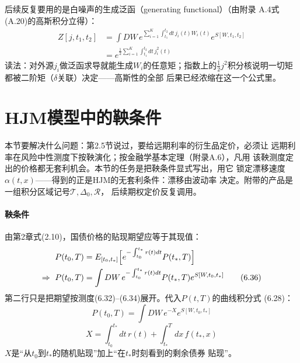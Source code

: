 
后续反复要用的是白噪声的生成泛函（generating functional）（由附录
A.4式(A.20)的高斯积分立得）：
\begin{align*}
Z[j,t_1,t_2]&=\int DW\,e^{\sum_{i=1}^{K}\int_{t_1}^{t_2}dt\,j_i(t)W_i(t)}
e^{S[W,t_1,t_2]}\\
&=e^{\frac{1}{2}\sum_{i=1}^{K}\int_{t_1}^{t_2}dt\,j_i^2(t)}
\tag{6.35}
\end{align*}
读法：对外源$j_i$做泛函求导就能生成$W_i$的任意矩；指数上的$\frac12
j^2$积分核说明一切矩都被二阶矩（$\delta$关联）决定——高斯性的全部
后果已经浓缩在这一个公式里。

\section{HJM模型中的鞅条件}

本节要解决什么问题：第2.5节说过，要给远期利率的衍生品定价，必须让
远期利率在风险中性测度下按鞅演化；按金融学基本定理（附录A.6），凡用
该鞅测度定出的价格都无套利机会。本节的任务是把鞅条件显式写出，用它
锁定漂移速度$\alpha(t,x)$——得到的正是HJM的无套利条件：漂移由波动率
决定。附带的产品是一组积分区域记号$\mathcal{T},\Delta_0,\mathcal{R}$，
后续期权定价反复调用。

\paragraph{鞅条件}
由第2章式(2.10)，国债价格的贴现期望应等于其现值：
\begin{align*}
P(t_0,T)&=E_{[t_0,t_*]}\Bigl[e^{-\int_{t_0}^{t_*}r(t)dt}P(t_*,T)\Bigr]\\
\Rightarrow\ P(t_0,T)&=\int DW\,e^{-\int_{t_0}^{t_*}r(t)dt}P(t_*,T)
e^{S[W,t_0,t_*]}
\tag{6.36}
\end{align*}
第二行只是把期望按测度(6.32)--(6.34)展开。代入$P(t,T)$的曲线积分式
(6.28)：
\begin{equation*}
P(t_0,T)=\int DW\,e^{-X}e^{S[W,t_0,t_*]}
\tag{6.37}
\end{equation*}
\begin{equation*}
X=\int_{t_0}^{t_*}dt\,r(t)+\int_{t_*}^{T}dx\,f(t_*,x)
\tag{6.38}
\end{equation*}
$X$是“从$t_0$到$t_*$的随机贴现”加上“在$t_*$时刻看到的剩余债券
贴现”。

